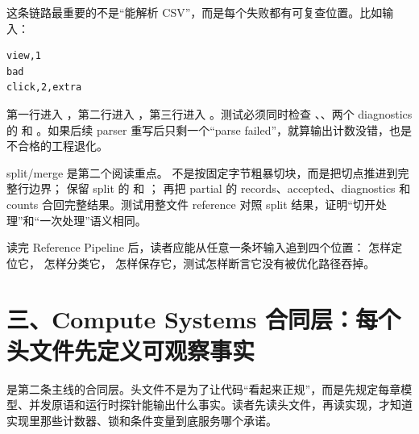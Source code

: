 这条链路最重要的不是“能解析 CSV”，而是每个失败都有可复查位置。比如输入：

\begin{lstlisting}[numbers=none]
view,1
bad
click,2,extra
\end{lstlisting}

第一行进入 ，第二行进入 ，第三行进入 。测试必须同时检查 、、两个 diagnostics 的  和 。如果后续 parser 重写后只剩一个“parse failed”，就算输出计数没错，也是不合格的工程退化。

split/merge 是第二个阅读重点。 不是按固定字节粗暴切块，而是把切点推进到完整行边界； 保留 split 的  和 ； 再把 partial 的 records、accepted、diagnostics 和 counts 合回完整结果。测试用整文件 reference 对照 split 结果，证明“切开处理”和“一次处理”语义相同。

\begin{sourcereadingbox}
读完 Reference Pipeline 后，读者应能从任意一条坏输入追到四个位置： 怎样定位它， 怎样分类它， 怎样保存它，测试怎样断言它没有被优化路径吞掉。
\end{sourcereadingbox}

\section{三、Compute Systems 合同层：每个头文件先定义可观察事实}

 是第二条主线的合同层。头文件不是为了让代码“看起来正规”，而是先规定每章模型、并发原语和运行时探针能输出什么事实。读者先读头文件，再读实现，才知道实现里那些计数器、锁和条件变量到底服务哪个承诺。

